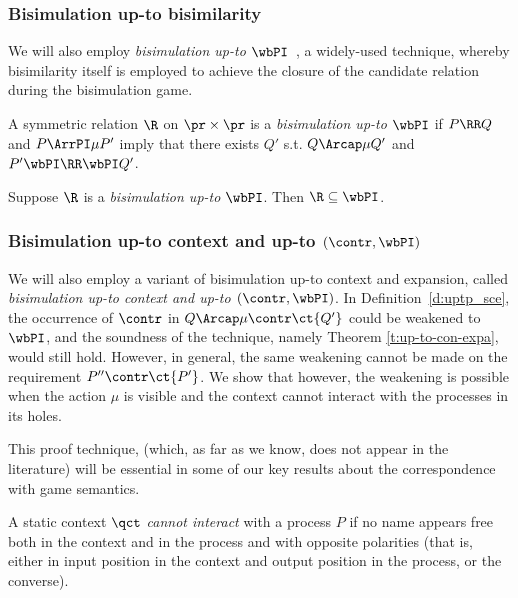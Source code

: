\subsubsection{Bisimulation up-to bisimilarity}
\label{ss:bisimulation_upto_wb}

We will also employ {\em bisimulation up-to $\wbPI$}~\cite{Mil89}, 
a widely-used technique,
whereby bisimilarity itself is employed to achieve 
the closure of the candidate relation during the bisimulation game.


\begin{definition}
  A symmetric relation $\R$ on $\pr  \times \pr$
  is a {\em bisimulation up-to $\wbPI$ } if $P  \RR  Q$ and $P
  \ArrPI\mu P'$ imply that  there exists $Q'$ s.t.
  $Q \Arcap\mu Q'$ and 
  $P' \wbPI  \RR \wbPI Q'$. 
\end{definition}
 

\begin{theorem}
\label{t:up-to}
  Suppose $\R$ is a {\em bisimulation up-to $\wbPI$}.
  Then $\R \subseteq \wbPI$.
\end{theorem}


\subsubsection{Bisimulation up-to context and up-to $(\contr,
\wbPI)$}

We will also employ
a variant of bisimulation up-to context and expansion, called 
{\em bisimulation up-to context and up-to $(\contr,\wbPI)$}.
In Definition~\ref{d:uptp_sce}, the occurrence of $\contr$  in 
$Q \Arcap\mu  \contr  \ct{Q'}$  could be weakened to $\wbPI$, and the
soundness of the technique, namely Theorem \ref{t:up-to-con-expa},
would still hold. However, in general, the same weakening
cannot be made on the requirement $P'' \contr \ct {P'}$.
We show that however, the weakening is possible when 
the action $\mu$ is visible and the context cannot interact with the
processes in its holes.

This proof technique, 
(which, as far as we know, does not appear in the literature) 
will be essential in some of our key results 
about the correspondence with game semantics.

\begin{definition}
  \label{d:interact}
  A static context $\qct$  \emph{cannot interact} with a process $P$
  if no name appears free both in the context and in
  the process and with opposite polarities (that is, either in input
  position in the context and output position in the process, or the
  converse).  
\end{definition} 

